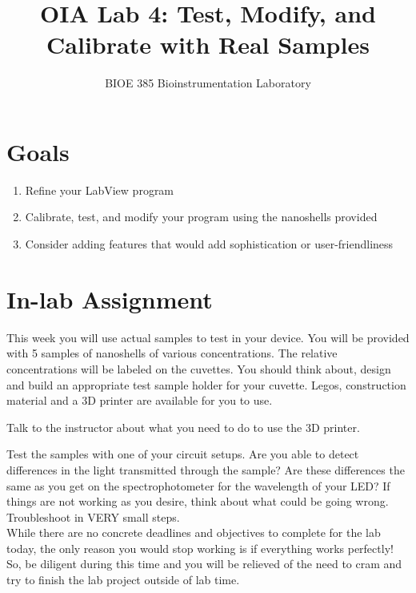 \documentclass{article}
\title{OIA Lab 4: Test, Modify, and Calibrate with Real Samples}
\author{BIOE 385 Bioinstrumentation Laboratory}
\date{}
\begin{document}
\large
\maketitle

\section*{Goals}
\begin{enumerate}
	\item Refine your LabView program
	\item Calibrate, test, and modify your program using the nanoshells provided
	\item Consider adding features that would add sophistication or user-friendliness
\end{enumerate}


\section*{In-lab Assignment}
This week you will use actual samples to test in your device. You will be provided with 5 samples of nanoshells of various concentrations. The relative concentrations will be labeled on the cuvettes. You should think about, design and build an appropriate test sample holder for your cuvette. Legos, construction material and a 3D printer are available for you to use. 
\begin{info}
Talk to the instructor about what you need to do to use the 3D printer.	
\end{info}


Test the samples with one of your circuit setups. Are you able to detect differences in the light transmitted through the sample? Are these differences the same as you get on the spectrophotometer for the wavelength of your LED? If things are not working as you desire, think about what could be going wrong. Troubleshoot in VERY small steps.\\

While there are no concrete deadlines and objectives to complete for the lab today, the only reason you would stop working is if everything works perfectly! So, be diligent during this time and you will be relieved of the need to cram and try to finish the lab project outside of lab time.
\end{document}
